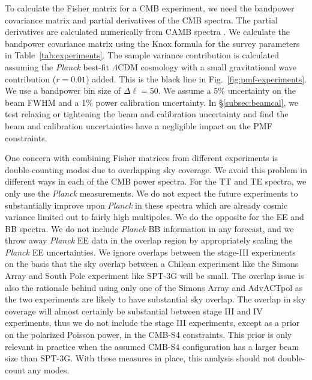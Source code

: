 \documentclass[apj]{emulateapj}
\newcommand{\lcdm}{\ensuremath{\Lambda}CDM}
\newcommand{\planck}{{\sl Planck}}
\begin{document}
To calculate the Fisher matrix for a CMB experiment, we need the bandpower covariance matrix and partial derivatives of the CMB spectra. 
The partial derivatives are calculated numerically from CAMB spectra  \citep{lewis00}. 
We calculate the bandpower covariance matrix using the Knox formula \citep{knox97} for the survey parameters in Table~\ref{tab:experiments}. 
The sample variance contribution is calculated assuming the \planck{} best-fit \lcdm{} cosmology with a small gravitational wave contribution  ($r=0.01$) added. 
This is the black line in Fig.~\ref{fig:pmf-experiments}. 
We use a bandpower bin size of $\Delta\ell=50$. 
We  assume a 5\% uncertainty on the beam FWHM and a 1\% power calibration uncertainty.
In \S\ref{subsec:beamcal}, we test relaxing or tightening the beam and calibration uncertainty and find the beam and calibration uncertainties have a negligible impact on the PMF constraints. 


One concern with combining Fisher matrices from different experiments is double-counting modes due to overlapping sky coverage. 
We avoid this problem in different ways in each of the CMB power spectra. 
For the TT and TE spectra, we only use the \planck{} measurements. 
We do not expect the future experiments to substantially improve upon \planck{} in these spectra which are already cosmic variance limited out to fairly high multipoles. 
We do the opposite for the EE and BB spectra. 
We do not include \planck{} BB information in any forecast, and we throw away \planck{} EE data in the overlap region by appropriately scaling the \planck{} EE uncertainties. 
We ignore overlaps between the stage-III experiments  on the basis that the sky overlap between a Chilean experiment like the Simons Array and South Pole experiment like SPT-3G will be small. 
The overlap issue is also the rationale behind using only one of the Simons Array and AdvACTpol as the two experiments are likely to have substantial sky overlap. 
The overlap in sky coverage will almost certainly be substantial between stage III and IV experiments, thus we do not include the stage III experiments, except as a prior on the polarized Poisson power, in the CMB-S4 constraints. 
This prior is only relevant in practice when the assumed CMB-S4 configuration has a larger beam size than SPT-3G. 
With these measures in place, this analysis should not double-count any modes. 
\end{document}
